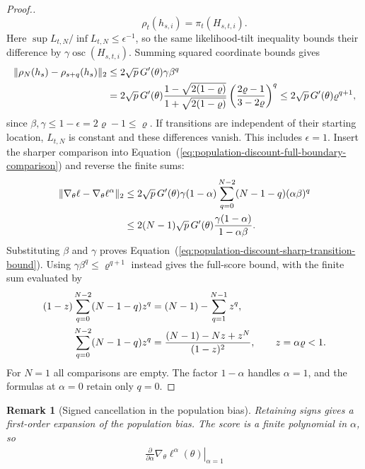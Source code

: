 \documentclass[11pt]{article}
\newtheorem{remark}{Remark}%
\theoremstyle{thmstylethree}%
\begin{document}
{\begin{proof}[Proof.]
\begin{equation}
\qquad \rho_t(h_{s,i})=\pi_t(H_{s,t,i}).
\label{eq:population-discount-two-boundary-expectations}
\end{equation}
Here $\sup L_{t,N}/\inf L_{t,N}\leq\epsilon^{-1}$, so the same
likelihood-tilt inequality bounds their difference by
$\gamma\operatorname{osc}(H_{s,t,i})$. Summing squared coordinate bounds
gives
\begin{align}
\|\rho_N(h_s)-\rho_{s+q}(h_s)\|_2
&\leq2\sqrt p\,G'(\theta)\gamma\beta^q\notag\\
&=2\sqrt p\,G'(\theta)
\frac{1-\sqrt{2(1-\varrho)}}{1+\sqrt{2(1-\varrho)}}
\left(\frac{2\varrho-1}{3-2\varrho}\right)^q
\leq2\sqrt p\,G'(\theta)\varrho^{q+1},
\label{eq:population-discount-vector-boundary-comparison}
\end{align}
since $\beta,\gamma\leq1-\epsilon=2\varrho-1\leq\varrho$.
If transitions are independent of their starting location, $L_{t,N}$
is constant and these differences vanish. This includes $\epsilon=1$.
\endgraf
Insert the sharper comparison into
Equation~(\ref{eq:population-discount-full-boundary-comparison}) and
reverse the finite sums:
\begin{align}
\|\nabla_\theta\ell-\nabla_\theta\ell^\alpha\|_2
&\leq2\sqrt p\,G'(\theta)\gamma(1-\alpha)
\sum_{q=0}^{N-2}(N-1-q)(\alpha\beta)^q\notag\\
&\leq2(N-1)\sqrt p\,G'(\theta)
\frac{\gamma(1-\alpha)}{1-\alpha\beta}.
\end{align}
Substituting $\beta$ and $\gamma$ proves
Equation~(\ref{eq:population-discount-sharp-transition-bound}). Using
$\gamma\beta^q\leq\varrho^{q+1}$ instead gives the full-score bound,
with the finite sum evaluated by
\begin{align}
(1-z)\sum_{q=0}^{N-2}(N-1-q)z^q
&=(N-1)-\sum_{q=1}^{N-1}z^q,\notag\\
\sum_{q=0}^{N-2}(N-1-q)z^q
&=\frac{(N-1)-Nz+z^N}{(1-z)^2},\qquad z=\alpha\varrho<1.
\label{eq:population-discount-finite-boundary-sum}
\end{align}
For $N=1$ all comparisons are empty. The factor $1-\alpha$ handles
$\alpha=1$, and the formulas at $\alpha=0$ retain only $q=0$.
\end{proof}
\endgraf
\begin{remark}[Signed cancellation in the population bias]
\label{rem:population-bias-cancellation}
Retaining signs gives a first-order expansion of the population bias.
The score is a finite polynomial in $\alpha$, so
\begin{align}
\left.\frac{\partial}{\partial\alpha}
\nabla_\theta\ell^\alpha(\theta)\right|_{\alpha=1}

\end{align}
\end{remark}}
\end{document}
